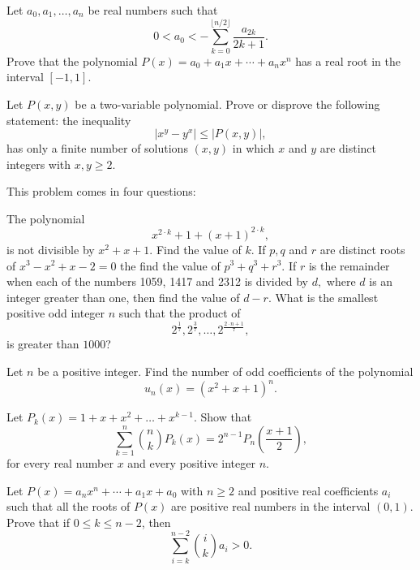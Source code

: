 \documentclass[12pt,a4paper]{memoir}
\theoremstyle{definition}
\begin{document}
\begin{question}[name={1998 Iran}]
	Let $a_0,a_1,\dots,a_n$ be real numbers such that
	\[0< a_0 < - \sum_{k=0}^{\lfloor n/2 \rfloor} \frac{a_{2k}}{2k+1}.\]
	Prove that the polynomial $P(x)=a_0+a_1x+\cdots+a_n x^{n}$ has a real root in the interval $[-1,1]$.
\end{question}

\begin{question}
	Let $P(x,y)$ be a two-variable polynomial. Prove or disprove the following statement: the inequality \[|x^y-y^x|\leq |P(x,y)|,\] has only a finite number of solutions $(x,y)$ in which $x$ and $y$ are distinct integers with $x,y \geq 2$.
\end{question}

\begin{question}[name={1988 IMO Longlist}]
	This problem comes in four questions:
	\begin{tasks}
		\task The polynomial \[x^{2 \cdot k} + 1 + (x+1)^{2 \cdot k},\] is not divisible by $x^2 + x + 1.$ Find the value of $k$.
		\task If $p,q$ and $r$ are distinct roots of $x^3 - x^2 + x - 2 = 0$ the find the value of $p^3 + q^3 + r^3$.
		\task If $r$ is the remainder when each of the numbers 1059, 1417 and 2312 is divided by $d,$ where $d$ is an integer greater than one, then find the value of $d-r$.
		\task What is the smallest positive odd integer $n$ such that the product of
		\[2^{\frac{1}{7}}, 2^{\frac{3}{7}}, \dots, 2^{\frac{2 \cdot n + 1}{7}},\]
		is greater than $1000$?
	\end{tasks}
\end{question}


\begin{question}[name={1988 IMO Longlist}]
	Let $n$ be a positive integer. Find the number of odd coefficients of the polynomial \[ u_n(x) = (x^2 + x + 1)^n.\]
\end{question}

\begin{question}[name={1998 Baltic Way}]
	Let $P_k(x)=1+x+x^2+\ldots +x^{k-1}$. Show that
	\[ \sum_{k=1}^n \binom{n}{k} P_k(x)=2^{n-1} P_n \left( \frac{x+1}{2} \right), \]
	for every real number $x$ and every positive integer $n$.
\end{question}


\begin{question}[name={1998 Iran}]
	Let $P(x)=a_nx^n+\cdots+a_1x+a_0$ with $n\geq 2$ and positive real coefficients $a_i$ such that all the roots of $P(x)$ are positive real numbers in the interval $(0,1)$. Prove that if $0\leq k \leq n-2$, then
	\[\sum_{i=k}^{n-2} \binom{i}{k} a_i > 0.\]
\end{question}
\end{document}
